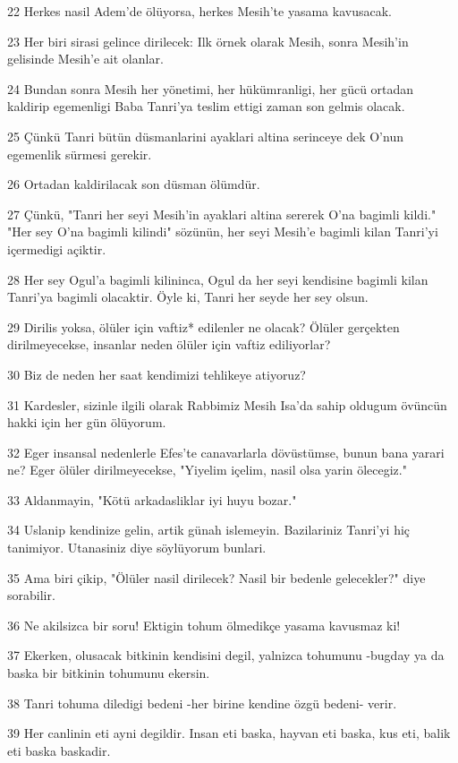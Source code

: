 \par 22 Herkes nasil Adem'de ölüyorsa, herkes Mesih'te yasama kavusacak.
\par 23 Her biri sirasi gelince dirilecek: Ilk örnek olarak Mesih, sonra Mesih'in gelisinde Mesih'e ait olanlar.
\par 24 Bundan sonra Mesih her yönetimi, her hükümranligi, her gücü ortadan kaldirip egemenligi Baba Tanri'ya teslim ettigi zaman son gelmis olacak.
\par 25 Çünkü Tanri bütün düsmanlarini ayaklari altina serinceye dek O'nun egemenlik sürmesi gerekir.
\par 26 Ortadan kaldirilacak son düsman ölümdür.
\par 27 Çünkü, "Tanri her seyi Mesih'in ayaklari altina sererek O'na bagimli kildi." "Her sey O'na bagimli kilindi" sözünün, her seyi Mesih'e bagimli kilan Tanri'yi içermedigi açiktir.
\par 28 Her sey Ogul'a bagimli kilininca, Ogul da her seyi kendisine bagimli kilan Tanri'ya bagimli olacaktir. Öyle ki, Tanri her seyde her sey olsun.
\par 29 Dirilis yoksa, ölüler için vaftiz* edilenler ne olacak? Ölüler gerçekten dirilmeyecekse, insanlar neden ölüler için vaftiz ediliyorlar?
\par 30 Biz de neden her saat kendimizi tehlikeye atiyoruz?
\par 31 Kardesler, sizinle ilgili olarak Rabbimiz Mesih Isa'da sahip oldugum övüncün hakki için her gün ölüyorum.
\par 32 Eger insansal nedenlerle Efes'te canavarlarla dövüstümse, bunun bana yarari ne? Eger ölüler dirilmeyecekse, "Yiyelim içelim, nasil olsa yarin ölecegiz."
\par 33 Aldanmayin, "Kötü arkadasliklar iyi huyu bozar."
\par 34 Uslanip kendinize gelin, artik günah islemeyin. Bazilariniz Tanri'yi hiç tanimiyor. Utanasiniz diye söylüyorum bunlari.
\par 35 Ama biri çikip, "Ölüler nasil dirilecek? Nasil bir bedenle gelecekler?" diye sorabilir.
\par 36 Ne akilsizca bir soru! Ektigin tohum ölmedikçe yasama kavusmaz ki!
\par 37 Ekerken, olusacak bitkinin kendisini degil, yalnizca tohumunu -bugday ya da baska bir bitkinin tohumunu ekersin.
\par 38 Tanri tohuma diledigi bedeni -her birine kendine özgü bedeni- verir.
\par 39 Her canlinin eti ayni degildir. Insan eti baska, hayvan eti baska, kus eti, balik eti baska baskadir.
